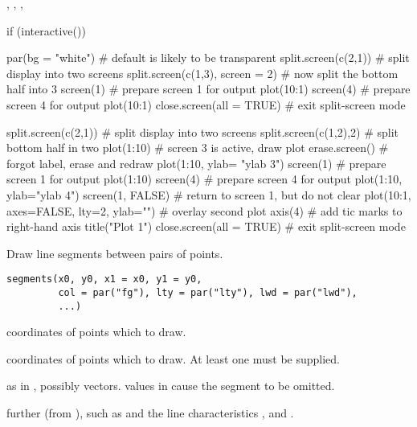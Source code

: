 %
\begin{SeeAlso}\relax
{}, , ,
\end{SeeAlso}
%
\begin{Examples}
\begin{ExampleCode}
if (interactive()) {
par(bg = "white")           # default is likely to be transparent
split.screen(c(2,1))        # split display into two screens
split.screen(c(1,3), screen = 2) # now split the bottom half into 3
screen(1) # prepare screen 1 for output
plot(10:1)
screen(4) # prepare screen 4 for output
plot(10:1)
close.screen(all = TRUE)    # exit split-screen mode

split.screen(c(2,1))        # split display into two screens
split.screen(c(1,2),2)      # split bottom half in two
plot(1:10)                  # screen 3 is active, draw plot
erase.screen()              # forgot label, erase and redraw
plot(1:10, ylab= "ylab 3")
screen(1)                   # prepare screen 1 for output
plot(1:10)
screen(4)                   # prepare screen 4 for output
plot(1:10, ylab="ylab 4")
screen(1, FALSE)            # return to screen 1, but do not clear
plot(10:1, axes=FALSE, lty=2, ylab="")  # overlay second plot
axis(4)                     # add tic marks to right-hand axis
title("Plot 1")
close.screen(all = TRUE)    # exit split-screen mode
}
\end{ExampleCode}
\end{Examples}
%
\begin{Description}\relax
Draw line segments between pairs of points.
\end{Description}
%
\begin{Usage}
\begin{verbatim}
segments(x0, y0, x1 = x0, y1 = y0,
         col = par("fg"), lty = par("lty"), lwd = par("lwd"),
         ...)
\end{verbatim}
\end{Usage}
%
\begin{Arguments}
\begin{ldescription}
\item[\code{x0, y0}] coordinates of points  which to draw.
\item[\code{x1, y1}] coordinates of points  which to draw.  At least
one must be supplied.
\item[\code{col, lty, lwd}]  as in
, possibly vectors.   values in 
cause the segment to be omitted.
\item[\code{...}] further  (from ),
such as  and the line characteristics , 
and .
\end{ldescription}
\end{Arguments}
